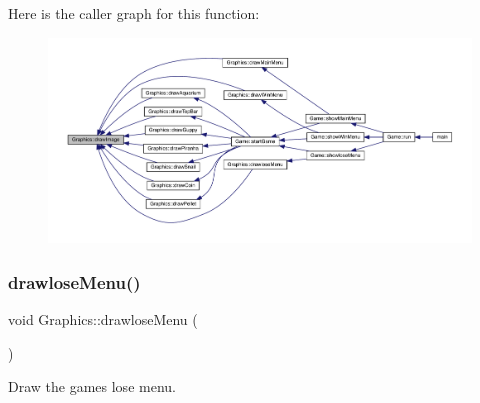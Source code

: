 Here is the caller graph for this function\+:
\nopagebreak
\begin{figure}[H]
\begin{center}
\leavevmode
\includegraphics[width=350pt]{class_graphics_afe0ce82b917ad83b8eaec222810f1efd_icgraph}
\end{center}
\end{figure}
\mbox{\label{class_graphics_a88bb368ba8388bc9e072c7f48208edba}} 
\subsubsection{\texorpdfstring{drawlose\+Menu()}{drawloseMenu()}}
{\footnotesize\ttfamily void Graphics\+::drawlose\+Menu (\begin{DoxyParamCaption}{ }\end{DoxyParamCaption})}



Draw the game\textquotesingle{}s lose menu. 

